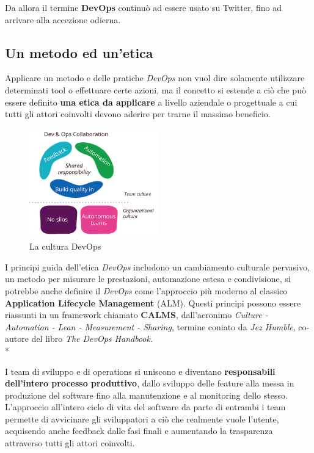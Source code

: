 \documentclass[a4paper,12pt]{report}
\begin{document}
				Da allora il termine \textbf{DevOps} continuò ad essere usato su Twitter, fino ad arrivare alla accezione odierna.
			
			\subsection{Un metodo ed un'etica}
			
				Applicare un metodo e delle pratiche \emph{DevOps} non vuol dire solamente utilizzare determinati tool o effettuare
				certe azioni, ma il concetto si estende a ciò che può essere definito \textbf{una etica da applicare} a livello aziendale o progettuale a cui tutti gli attori coinvolti devono aderire per trarne il massimo beneficio.
				
				\begin{figure}[h]
					\centering
					\includegraphics[width=0.5\textwidth]{devops_culture}
					\caption{La cultura DevOps}
					\label{fig:devops_culture}
				\end{figure}
				
				I principi guida dell'etica \emph{DevOps} includono un cambiamento culturale pervasivo, un metodo per misurare le prestazioni, automazione estesa e condivisione, si potrebbe anche definire il \emph{DevOps} come l'approccio più moderno al classico \textbf{Application Lifecycle Management} (ALM). Questi principi possono essere riassunti in un framework chiamato \textbf{CALMS}, dall'acronimo \emph{Culture - Automation - Lean - Measurement - Sharing}, termine coniato da \emph{Jez Humble}, co-autore del libro \emph{The DevOps Handbook}.\\*
				
				I team di sviluppo e di operations si uniscono e diventano \textbf{responsabili dell'intero processo produttivo}, dallo sviluppo delle feature alla messa in produzione del software fino alla manutenzione e al monitoring dello stesso. L'approccio all'intero ciclo di vita del software da parte di entrambi i team permette di avvicinare gli sviluppatori a ciò che realmente vuole l'utente, acquisendo anche feedback dalle fasi finali e aumentando la trasparenza attraverso tutti gli attori coinvolti.
			
\end{document}
